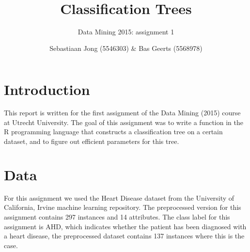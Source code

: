 \documentclass[a4paper,12pt]{scrartcl}
\begin{document}
\title{Classification Trees}
\subtitle{Data Mining 2015: assignment 1}
\author{Sebastiaan Jong (5546303) \& Bas Geerts (5568978)}
\date{}
\maketitle
\section{Introduction}
This report is written for the first assignment of the Data Mining (2015) course at Utrecht University. The goal of this assignment was to write a function in the R programming language that constructs a classification tree on a certain dataset, and to figure out efficient parameters for this tree.
\section{Data}
For this assignment we used the Heart Disease dataset from the University of California, Irvine machine learning repository. The preprocessed version for this assignment contains 297 instances and 14 attributes. The class label for this assignment is AHD, which indicates whether the patient has been diagnosed with a heart disease, the preprocessed dataset contains 137 instances where this is the case.
\end{document}
